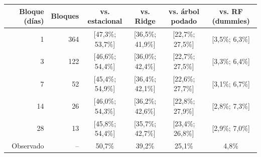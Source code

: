 \begin{tabular}{rrcccc}
\toprule
Bloque (días) & Bloques & vs. estacional & vs. Ridge & vs. árbol podado & vs. RF (dummies) \\
\midrule
1 & 364 & [47{,}3\%; 53{,}7\%] & [36{,}5\%; 41{,}9\%] & [22{,}7\%; 27{,}5\%] & [3{,}5\%; 6{,}3\%] \\
3 & 122 & [46{,}6\%; 54{,}4\%] & [36{,}0\%; 42{,}4\%] & [22{,}7\%; 27{,}5\%] & [3{,}3\%; 6{,}4\%] \\
7 & 52 & [45{,}4\%; 54{,}9\%] & [36{,}4\%; 42{,}1\%] & [22{,}6\%; 27{,}7\%] & [3{,}1\%; 6{,}7\%] \\
14 & 26 & [46{,}0\%; 54{,}3\%] & [36{,}2\%; 42{,}6\%] & [22{,}8\%; 27{,}9\%] & [2{,}8\%; 7{,}3\%] \\
28 & 13 & [45{,}8\%; 54{,}4\%] & [35{,}7\%; 42{,}7\%] & [23{,}4\%; 26{,}8\%] & [2{,}9\%; 7{,}0\%] \\
\midrule
Observado & -- & 50{,}7\% & 39{,}2\% & 25{,}1\% & 4{,}8\% \\
\bottomrule
\end{tabular}